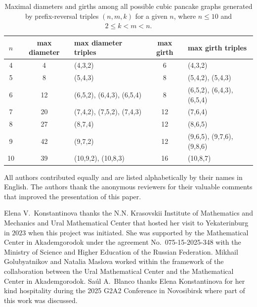 \documentclass[
final
]{dmtcs-episciences}
\begin{document}
\begin{table}[htbp]
\centering
\small
\setlength{\tabcolsep}{4pt}
\renewcommand{\arraystretch}{1.2}
\begin{tabular}{|c| c| >{\raggedright\arraybackslash}p{2.4cm}| c| >{\raggedright\arraybackslash}p{3.8cm}|}
\hline
$n$ & max diameter & max diameter triples & max girth & max girth triples \\
\hline
4 & 4 & (4,3,2) & 6 & (4,3,2) \newline \\ \hline
5 & 8 & (5,4,3) & 8 & (5,4,2), (5,4,3)\newline \\ \hline
6 & 12 & (6,5,2), (6,4,3), (6,5,4) & 8 & (6,5,2), (6,4,3), (6,5,4) \\ \hline
7 & 20 & (7,4,2), (7,5,2), (7,4,3) & 12 & (7,6,4) \\ \hline
8 & 27 & (8,7,4) & 12 & (8,6,5) \newline \\ \hline
9 & 42 & (9,7,2) & 12 & (9,6,5), (9,7,6), (9,8,6) \newline \\  \hline
10 & 39 & (10,9,2), (10,8,3) & 16 & (10,8,7) \newline \\
\hline
\end{tabular}
\caption{Maximal diameters and girths among all possible cubic pancake graphs generated by prefix-reversal triples $(n,m,k)$ for a given $n$, where $n \leqslant 10$ and $2\leqslant k < m < n$.}
\label{tab:maximal_properties}
\end{table}

\acknowledgements
\label{sec:ack}
All authors contributed equally and are listed alphabetically by their names in English. The authors thank the anonymous reviewers for their valuable comments that improved the presentation of this paper.

Elena V.~Konstantinova thanks the N.N. Krasovskii Institute of Mathematics and Mechanics and Ural Mathematical Center that hosted her visit to Yekaterinburg in $2023$ when this project was initiated. She was supported by the Mathematical Center in Akademgorodok under the agreement No.~075-15-2025-348 with the Ministry of Science and Higher Education of the Russian Federation. Mikhail Golubyatnikov and  Natalia Maslova worked within the framework of the collaboration between the Ural Mathematical Center and the Mathematical Center in Akademgorodok. Sa\'ul A.~Blanco thanks Elena Konstantinova for her kind hospitality during the 2025 G2A2 Conference in Novosibirsk where part of this work was discussed. 
\end{document}
